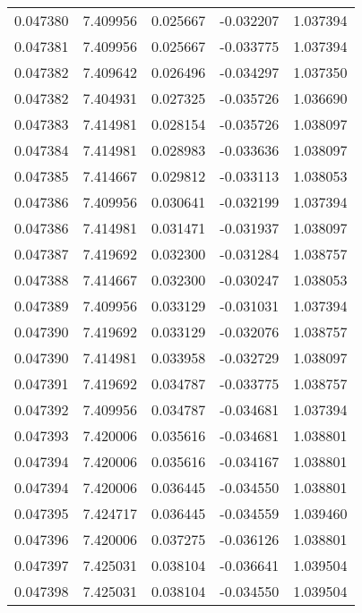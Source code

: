 \begin{tabular}{lrrrr}
0.047380    &  7.409956 &  0.025667 & -0.032207 &             1.037394 \\
0.047381    &  7.409956 &  0.025667 & -0.033775 &             1.037394 \\
0.047382    &  7.409642 &  0.026496 & -0.034297 &             1.037350 \\
0.047382    &  7.404931 &  0.027325 & -0.035726 &             1.036690 \\
0.047383    &  7.414981 &  0.028154 & -0.035726 &             1.038097 \\
0.047384    &  7.414981 &  0.028983 & -0.033636 &             1.038097 \\
0.047385    &  7.414667 &  0.029812 & -0.033113 &             1.038053 \\
0.047386    &  7.409956 &  0.030641 & -0.032199 &             1.037394 \\
0.047386    &  7.414981 &  0.031471 & -0.031937 &             1.038097 \\
0.047387    &  7.419692 &  0.032300 & -0.031284 &             1.038757 \\
0.047388    &  7.414667 &  0.032300 & -0.030247 &             1.038053 \\
0.047389    &  7.409956 &  0.033129 & -0.031031 &             1.037394 \\
0.047390    &  7.419692 &  0.033129 & -0.032076 &             1.038757 \\
0.047390    &  7.414981 &  0.033958 & -0.032729 &             1.038097 \\
0.047391    &  7.419692 &  0.034787 & -0.033775 &             1.038757 \\
0.047392    &  7.409956 &  0.034787 & -0.034681 &             1.037394 \\
0.047393    &  7.420006 &  0.035616 & -0.034681 &             1.038801 \\
0.047394    &  7.420006 &  0.035616 & -0.034167 &             1.038801 \\
0.047394    &  7.420006 &  0.036445 & -0.034550 &             1.038801 \\
0.047395    &  7.424717 &  0.036445 & -0.034559 &             1.039460 \\
0.047396    &  7.420006 &  0.037275 & -0.036126 &             1.038801 \\
0.047397    &  7.425031 &  0.038104 & -0.036641 &             1.039504 \\
0.047398    &  7.425031 &  0.038104 & -0.034550 &             1.039504 \\

\end{tabular}

